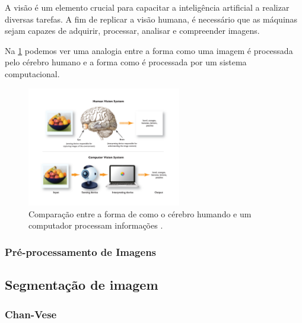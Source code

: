 \documentclass[
	12pt,				%
	openright,			%
	twoside,			%
	a4paper,			%
	english,			%
	french,				%
	spanish,			%
	brazil				%
	]{abntex2}
\begin{document}
A visão é um elemento crucial para capacitar a inteligência artificial a realizar diversas tarefas. A fim de replicar a visão humana, é necessário que as máquinas sejam capazes de adquirir, processar, analisar e compreender imagens. \cite{como_funciona_visao_computacional}

Na \cref{fig:comp_vision} podemos ver uma analogia entre a forma como uma imagem é processada pelo cérebro humano e a forma como é processada por um sistema computacional.

\begin{figure}[!ht]
	\centering
	\includegraphics[width=0.6\textwidth]{figures/content_Human_Vision.png}
	\caption{Comparação entre a forma de como o cérebro humando e um computador processam informações \cite{content_Human_Vision}.}
	\label{fig:comp_vision}
\end{figure}	

\subsubsection{Pré-processamento de Imagens}




\subsection{Segmentação de imagem}


\subsubsection{Chan-Vese}
\end{document}
